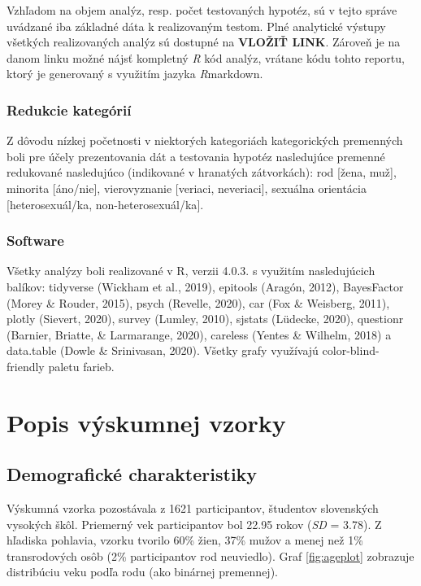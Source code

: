\documentclass[
]{article}
\begin{document}
Vzhľadom na objem analýz, resp. počet testovaných hypotéz, sú v tejto správe uvádzané iba základné dáta k realizovaným testom. Plné analytické výstupy všetkých realizovaných analýz sú dostupné na \textbf{VLOŽIŤ LINK}. Zároveň je na danom linku možné nájsť kompletný \emph{R} kód analýz, vrátane kódu tohto reportu, ktorý je generovaný s využitím jazyka \emph{R}markdown.

\hypertarget{redukcie-kateguxf3riuxed}{%
\subsubsection{Redukcie kategórií}\label{redukcie-kateguxf3riuxed}}

Z dôvodu nízkej početnosti v niektorých kategoriách kategorických premenných boli pre účely prezentovania dát a testovania hypotéz nasledujúce premenné redukované nasledujúco (indikované v hranatých zátvorkách): rod {[}žena, muž{]}, minorita {[}áno/nie{]}, vierovyznanie {[}veriaci, neveriaci{]}, sexuálna orientácia {[}heterosexuál/ka, non-heterosexuál/ka{]}.

\hypertarget{software}{%
\subsubsection{Software}\label{software}}

Všetky analýzy boli realizované v R, verzii 4.0.3. s využitím nasledujúcich balíkov: tidyverse (Wickham et al., 2019), epitools (Aragón, 2012), BayesFactor (Morey \& Rouder, 2015), psych (Revelle, 2020), car (Fox \& Weisberg, 2011), plotly (Sievert, 2020), survey (Lumley, 2010), sjstats (Lüdecke, 2020), questionr (Barnier, Briatte, \& Larmarange, 2020), careless (Yentes \& Wilhelm, 2018) a data.table (Dowle \& Srinivasan, 2020). Všetky grafy využívajú color-blind-friendly paletu farieb.

\newpage

\hypertarget{popis-vzorky}{%
\section{Popis výskumnej vzorky}\label{popis-vzorky}}

\hypertarget{demografickuxe9-charakteristiky}{%
\subsection{Demografické charakteristiky}\label{demografickuxe9-charakteristiky}}

Výskumná vzorka pozostávala z 1621 participantov, študentov slovenských vysokých škôl. Priemerný vek participantov bol 22.95 rokov (\emph{SD} = 3.78). Z hľadiska pohlavia, vzorku tvorilo 60\% žien, 37\% mužov a menej než 1\% transrodových osôb (2\% participantov rod neuviedlo). Graf \ref{fig:ageplot} zobrazuje distribúciu veku podľa rodu (ako binárnej premennej).
\end{document}
